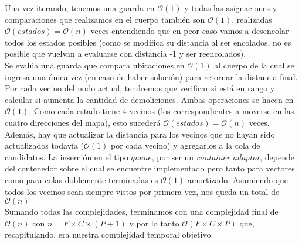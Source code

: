     Una vez iterando, tenemos una guarda en $\mathcal{O}(1)$ y todas las asignaciones y comparaciones que realizamos en el cuerpo también son $\mathcal{O}(1)$, realizadas $\mathcal{O}(estados) = \mathcal{O}(n)$ veces entendiendo que en peor caso vamos a desencolar todos los estados posibles (como se modifica su distancia al ser encolados, no es posible que vuelvan a evaluarse con distancia -1 y ser reencolados).
    \\

    Se evalúa una guarda que compara ubicaciones en $\mathcal{O}(1)$ al cuerpo de la cual se ingresa una única vez (en caso de haber solución) para retornar la distancia final.
    \\

    Por cada vecino del nodo actual, tendremos que verificar si está en rango y calcular si aumenta la cantidad de demoliciones. Ambas operaciones se hacen en $\mathcal{O}(1)$. Como cada estado tiene 4 vecinos (los correspondientes a moverse en las cuatro direcciones del mapa), esto sucederá $\mathcal{O}(estados) = \mathcal{O}(n) $ veces. Además, hay que actualizar la distancia para los vecinos que no hayan sido actualizados todavía ($\mathcal{O}(1)$ por cada vecino) y agregarlos a la cola de candidatos. La inserción en el tipo $queue$, por ser un \emph{container adaptor}, depende del contenedor sobre el cual se encuentre implementado pero tanto para vectores como para colas doblemente terminadas es $\mathcal{O}(1)$ amortizado. Asumiendo que todos los vecinos sean siempre vistos por primera vez, nos queda un total de $\mathcal{O}(n)$
    \\

    Sumando todas las complejidades, terminamos con una complejidad final de $\mathcal{O}(n)$ con $n = F\times C\times (P+1)$ y por lo tanto $\mathcal{O}(F\times C\times P)$ que, recapitulando, era nuestra complejidad temporal objetivo.
